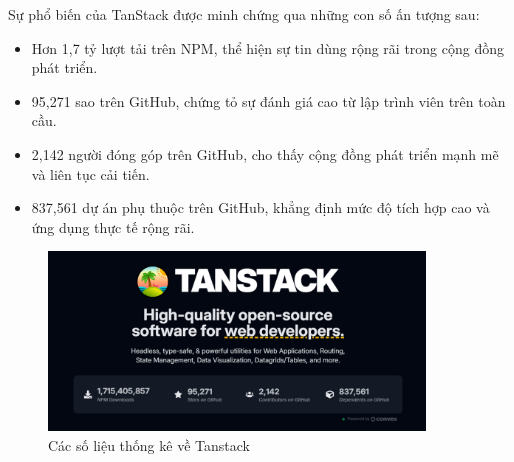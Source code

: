 \begin{enumerate}[(a)]
	      Sự phổ biến của TanStack được minh chứng qua những con số ấn tượng sau:

	      \begin{itemize}
		      \item Hơn 1,7 tỷ lượt tải trên NPM, thể hiện sự tin dùng rộng rãi trong cộng đồng phát triển.
		      \item 95,271 sao trên GitHub, chứng tỏ sự đánh giá cao từ lập trình viên trên toàn cầu.
		      \item 2,142 người đóng góp trên GitHub, cho thấy cộng đồng phát triển mạnh mẽ và liên tục cải tiến.
		      \item 837,561 dự án phụ thuộc trên GitHub, khẳng định mức độ tích hợp cao và ứng dụng thực tế rộng rãi.
	      \end{itemize}

	      \begin{figure}[H]
		      \centering
		      \includegraphics[width=10cm]{Images/tanstack-stats.png}
		      \vspace{0.5cm}
		      \caption{Các số liệu thống kê về Tanstack \cite{TanStack}}
		      \label{fig:my_label}
	      \end{figure}



\end{enumerate}